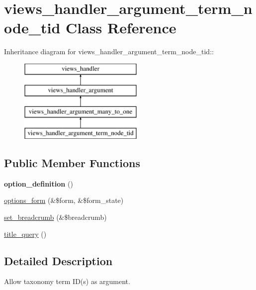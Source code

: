\hypertarget{classviews__handler__argument__term__node__tid}{
\section{views\_\-handler\_\-argument\_\-term\_\-node\_\-tid Class Reference}
\label{classviews__handler__argument__term__node__tid}
}
Inheritance diagram for views\_\-handler\_\-argument\_\-term\_\-node\_\-tid::\begin{figure}[H]
\begin{center}
\leavevmode
\includegraphics[height=4cm]{classviews__handler__argument__term__node__tid}
\end{center}
\end{figure}
\subsection*{Public Member Functions}
\begin{DoxyCompactItemize}
\item 
\hypertarget{classviews__handler__argument__term__node__tid_aaa442cbd37f901be13e6db17f61e8d02}{
{\bfseries option\_\-definition} ()}
\label{classviews__handler__argument__term__node__tid_aaa442cbd37f901be13e6db17f61e8d02}

\item 
\hyperlink{classviews__handler__argument__term__node__tid_af00552a1378333434154989c051d0e98}{options\_\-form} (\&\$form, \&\$form\_\-state)
\item 
\hyperlink{classviews__handler__argument__term__node__tid_aef9753aafd176e2e63c4a99be1177175}{set\_\-breadcrumb} (\&\$breadcrumb)
\item 
\hyperlink{classviews__handler__argument__term__node__tid_a9f858ee5c343f6a14b87a320316710f0}{title\_\-query} ()
\end{DoxyCompactItemize}


\subsection{Detailed Description}
Allow taxonomy term ID(s) as argument. 

